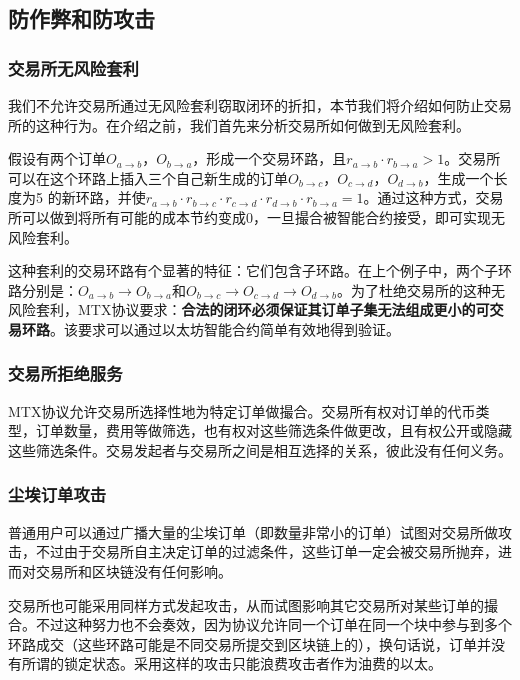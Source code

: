 \documentclass[UTF8,nofonts]{ctexart}
\begin{document}
\subsection{防作弊和防攻击}

\subsubsection{交易所无风险套利}
我们不允许交易所通过无风险套利窃取闭环的折扣，本节我们将介绍如何防止交易所的这种行为。在介绍之前，我们首先来分析交易所如何做到无风险套利。

假设有两个订单$O_{a\rightarrow b}$，$O_{b\rightarrow a}$，形成一个交易环路，且$r_{a\rightarrow b} \cdot r_{b\rightarrow a} > 1$。交易所可以在这个环路上插入三个自己新生成的订单$O_{b\rightarrow c}$，$O_{c\rightarrow d}$，$O_{d\rightarrow b}$，生成一个长度为5
的新环路，并使$r_{a\rightarrow b}  \cdot r_{b\rightarrow c} \cdot r_{c\rightarrow d}\cdot r_{d\rightarrow b}\cdot r_{b\rightarrow a}  = 1$。通过这种方式，交易所可以做到将所有可能的成本节约变成0，一旦撮合被智能合约接受，即可实现无风险套利。

这种套利的交易环路有个显著的特征：它们包含子环路。在上个例子中，两个子环路分别是：$O_{a\rightarrow b}\rightarrow O_{b\rightarrow a}$和$O_{b\rightarrow c}\rightarrow O_{c\rightarrow d}\rightarrow O_{d\rightarrow b}$。为了杜绝交易所的这种无风险套利，MTX协议要求：{\bfseries 合法的闭环必须保证其订单子集无法组成更小的可交易环路}。该要求可以通过以太坊智能合约简单有效地得到验证。

\subsubsection{交易所拒绝服务}

MTX协议允许交易所选择性地为特定订单做撮合。交易所有权对订单的代币类型，订单数量，费用等做筛选，也有权对这些筛选条件做更改，且有权公开或隐藏这些筛选条件。交易发起者与交易所之间是相互选择的关系，彼此没有任何义务。

\subsubsection{尘埃订单攻击}
普通用户可以通过广播大量的尘埃订单（即数量非常小的订单）试图对交易所做攻击，不过由于交易所自主决定订单的过滤条件，这些订单一定会被交易所抛弃，进而对交易所和区块链没有任何影响。

交易所也可能采用同样方式发起攻击，从而试图影响其它交易所对某些订单的撮合。不过这种努力也不会奏效，因为协议允许同一个订单在同一个块中参与到多个环路成交（这些环路可能是不同交易所提交到区块链上的），换句话说，订单并没有所谓的锁定状态。采用这样的攻击只能浪费攻击者作为油费的以太。
\end{document}
